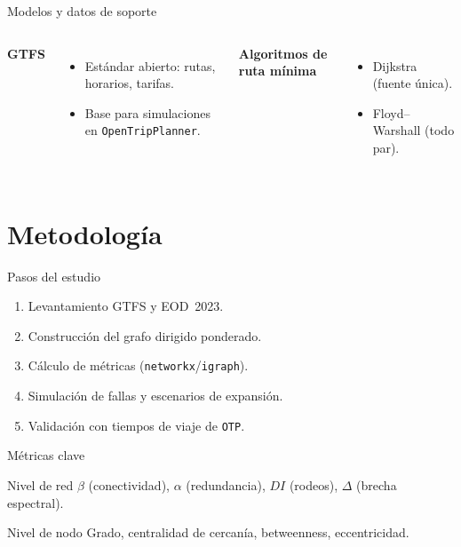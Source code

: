\documentclass[aspectratio=169,spanish]{beamer}
\begin{document}
\begin{frame}{Modelos y datos de soporte}
  \begin{columns}
      \textbf{GTFS}
      \begin{itemize}
        \item Estándar abierto: rutas, horarios, tarifas.
        \item Base para simulaciones en \texttt{OpenTripPlanner}.
      \end{itemize}
      \textbf{Algoritmos de ruta mínima}
      \begin{itemize}
        \item Dijkstra (fuente única).
        \item Floyd–Warshall (todo par).
      \end{itemize}
  \end{columns}
\end{frame}

\section{Metodología}

\begin{frame}{Pasos del estudio}
  \begin{enumerate}
    \item Levantamiento GTFS y EOD~2023.
    \item Construcción del grafo dirigido ponderado.
    \item Cálculo de métricas (\texttt{networkx}/\texttt{igraph}).
    \item Simulación de fallas y escenarios de expansión.
    \item Validación con tiempos de viaje de \texttt{OTP}.
  \end{enumerate}
\end{frame}

\begin{frame}{Métricas clave}
  \begin{block}{Nivel de red}
    $\beta$ (conectividad), $\alpha$ (redundancia), $DI$ (rodeos), $\Delta$ (brecha espectral).
  \end{block}
  \vspace{0.4cm}
  \begin{block}{Nivel de nodo}
    Grado, centralidad de cercanía, betweenness, eccentricidad.
  \end{block}
\end{frame}
\end{document}
